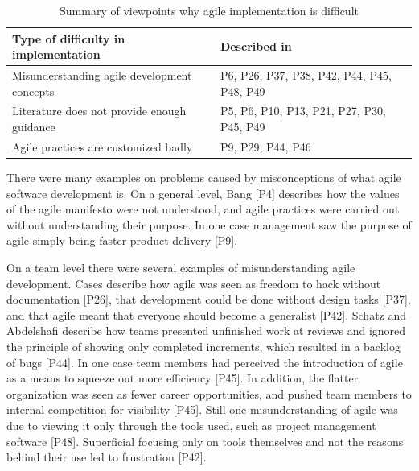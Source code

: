 \begin{table}[h]
    \centering
    \begin{tabular}{ >{\raggedright\arraybackslash}p{}
                     >{\raggedright\arraybackslash}p{} }
        \toprule
        Type of difficulty in implementation  &  Described in \\
        \midrule
        Misunderstanding agile development concepts  &
                P6, P26, P37, P38, P42, P44, P45, P48, P49      \\
        Literature does not provide enough guidance  &
                P5, P6, P10, P13, P21, P27, P30, P45, P49     \\
        Agile practices are customized badly   &
                P9, P29, P44, P46  \\
        \bottomrule
    \end{tabular}
    \caption{Summary of viewpoints why agile implementation is difficult}
    \label{table:challenges_difficulty}
\end{table}



There were many examples on problems caused by misconceptions of what agile
software development is. On a general level, Bang [P4] describes how the values
of the agile manifesto were not understood, and agile practices were carried out
without understanding their purpose. In one case management saw the purpose of
agile simply being faster product delivery [P9].

On a team level there were several examples of misunderstanding agile
development. Cases describe how agile was seen as freedom to hack without
documentation [P26], that development could be done without design tasks [P37],
and that agile meant that everyone should become a generalist [P42]. Schatz and
Abdelshafi describe how teams presented unfinished work at reviews and ignored
the principle of showing only completed increments, which resulted in a backlog
of bugs [P44]. In one case team members had perceived the introduction of agile
as a means to squeeze out more efficiency [P45]. In addition, the flatter
organization was seen as fewer career opportunities, and pushed team members to
internal competition for visibility [P45].
Still one misunderstanding of agile was due to viewing it only through the tools
used, such as project management software [P48]. Superficial focusing only on
tools themselves and not the reasons behind their use led to frustration [P42].

